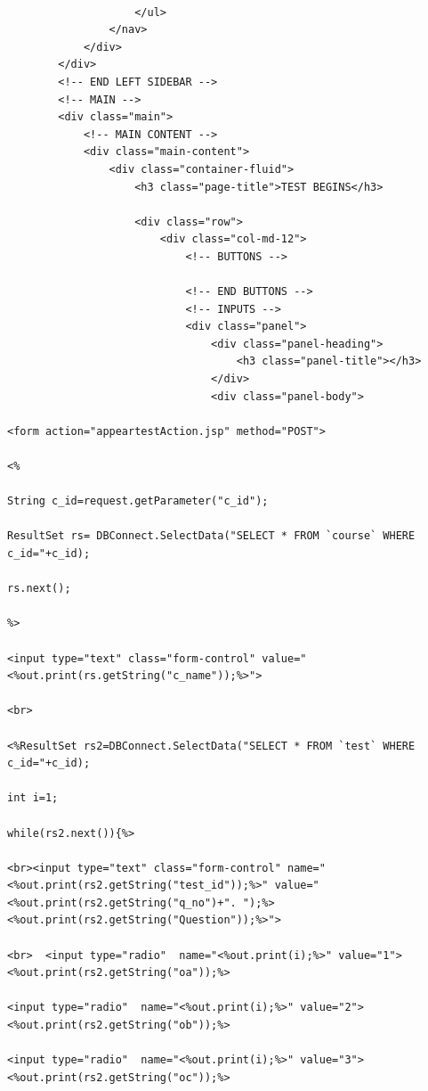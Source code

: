 \begin{lstlisting}
				
					</ul>
				</nav>
			</div>
		</div>
		<!-- END LEFT SIDEBAR -->
		<!-- MAIN -->
		<div class="main">
			<!-- MAIN CONTENT -->
			<div class="main-content">
				<div class="container-fluid">
					<h3 class="page-title">TEST BEGINS</h3>
                                          
					<div class="row">
						<div class="col-md-12">
							<!-- BUTTONS -->
							
							<!-- END BUTTONS -->
							<!-- INPUTS -->
							<div class="panel">
								<div class="panel-heading">
									<h3 class="panel-title"></h3>
								</div>
								<div class="panel-body">
                                                                   <form action="appeartestAction.jsp" method="POST">
                                                                     <%
                                                                     String c_id=request.getParameter("c_id");
                                                                     ResultSet rs= DBConnect.SelectData("SELECT * FROM `course` WHERE c_id="+c_id);
                                                                     rs.next();
                                                                     %>           
                                                                     <input type="text" class="form-control" value="<%out.print(rs.getString("c_name"));%>">           
                                                                      <br>
                                                                     <%ResultSet rs2=DBConnect.SelectData("SELECT * FROM `test` WHERE c_id="+c_id); 
                                                                     int i=1;
                                                                         while(rs2.next()){%>
                                                                           <br><input type="text" class="form-control" name="<%out.print(rs2.getString("test_id"));%>" value="<%out.print(rs2.getString("q_no")+". ");%><%out.print(rs2.getString("Question"));%>">               
                                                                         <br>  <input type="radio"  name="<%out.print(i);%>" value="1"><%out.print(rs2.getString("oa"));%>
                                                                           <input type="radio"  name="<%out.print(i);%>" value="2"><%out.print(rs2.getString("ob"));%>
                                                                           <input type="radio"  name="<%out.print(i);%>" value="3"><%out.print(rs2.getString("oc"));%>

\end{lstlisting}
